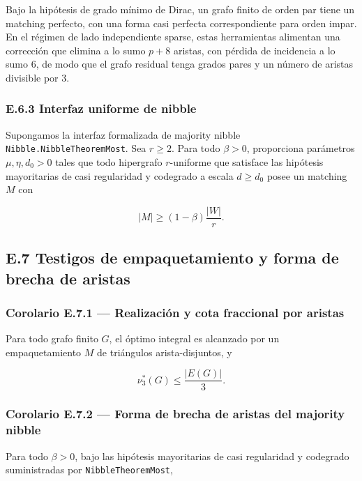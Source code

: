 \documentclass[spanish,11pt,a4paper]{article}
\begin{document}
Bajo la hipótesis de grado mínimo de Dirac, un grafo finito de orden par
tiene un matching perfecto, con una forma casi perfecta correspondiente
para orden impar. En el régimen de lado independiente sparse, estas
herramientas alimentan una corrección que elimina a lo sumo \(p+8\)
aristas, con pérdida de incidencia a lo sumo \(6\), de modo que el grafo
residual tenga grados pares y un número de aristas divisible por \(3\).

\subsubsection{E.6.3 Interfaz uniforme de
nibble}\label{e.6.3-interfaz-uniforme-de-nibble}

Supongamos la interfaz formalizada de majority nibble
\nolinkurl{Nibble.NibbleTheoremMost}. Sea \(r\ge2\). Para todo \(\beta>0\),
proporciona parámetros \(\mu,\eta,d_0>0\) tales que todo hipergrafo
\(r\)-uniforme que satisface las hipótesis mayoritarias de casi
regularidad y codegrado a escala \(d\ge d_0\) posee un matching \(M\)
con

\[|M|\ge(1-\beta)\frac{|W|}{r}.\]

\subsection{E.7 Testigos de empaquetamiento y forma de brecha de
aristas}\label{e.7-testigos-de-empaquetamiento-y-forma-de-brecha-de-aristas}

\subsubsection{Corolario E.7.1 --- Realización y cota fraccional por
aristas}\label{corolario-e.7.1-realizaciuxf3n-y-cota-fraccional-por-aristas}

Para todo grafo finito \(G\), el óptimo integral es alcanzado por un
empaquetamiento \(M\) de triángulos arista-disjuntos, y

\[\nu_3^*(G)\le\frac{|E(G)|}{3}.\]

\subsubsection{Corolario E.7.2 --- Forma de brecha de aristas del
majority
nibble}\label{corolario-e.7.2-forma-de-brecha-de-aristas-del-majority-nibble}

Para todo \(\beta>0\), bajo las hipótesis mayoritarias de casi
regularidad y codegrado suministradas por \nolinkurl{NibbleTheoremMost},
\end{document}
